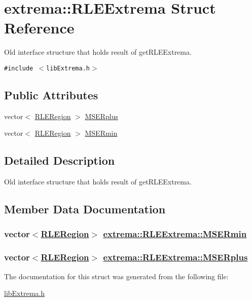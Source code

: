 \hypertarget{structextrema_1_1RLEExtrema}{
\section{extrema::RLEExtrema Struct Reference}
\label{structextrema_1_1RLEExtrema}
}
Old interface structure that holds result of get\-RLEExtrema.  


{\tt \#include $<$lib\-Extrema.h$>$}

\subsection*{Public Attributes}
\begin{CompactItemize}
\item 
vector$<$ \hyperlink{structextrema_1_1RLERegion}{RLERegion} $>$ \hyperlink{structextrema_1_1RLEExtrema_746a2de45213c8dca8240a50223fcfd3}{MSERplus}
\item 
vector$<$ \hyperlink{structextrema_1_1RLERegion}{RLERegion} $>$ \hyperlink{structextrema_1_1RLEExtrema_57b2bfbfce432ab110cb6f0b6826a5aa}{MSERmin}
\end{CompactItemize}


\subsection{Detailed Description}
Old interface structure that holds result of get\-RLEExtrema. 



\subsection{Member Data Documentation}
\hypertarget{structextrema_1_1RLEExtrema_57b2bfbfce432ab110cb6f0b6826a5aa}{
\subsubsection[MSERmin]{\setlength{\rightskip}{0pt plus 5cm}vector$<$\hyperlink{structextrema_1_1RLERegion}{RLERegion}$>$ \hyperlink{structextrema_1_1RLEExtrema_57b2bfbfce432ab110cb6f0b6826a5aa}{extrema::RLEExtrema::MSERmin}}}
\label{structextrema_1_1RLEExtrema_57b2bfbfce432ab110cb6f0b6826a5aa}


\hypertarget{structextrema_1_1RLEExtrema_746a2de45213c8dca8240a50223fcfd3}{
\subsubsection[MSERplus]{\setlength{\rightskip}{0pt plus 5cm}vector$<$\hyperlink{structextrema_1_1RLERegion}{RLERegion}$>$ \hyperlink{structextrema_1_1RLEExtrema_746a2de45213c8dca8240a50223fcfd3}{extrema::RLEExtrema::MSERplus}}}
\label{structextrema_1_1RLEExtrema_746a2de45213c8dca8240a50223fcfd3}




The documentation for this struct was generated from the following file:\begin{CompactItemize}
\item 
\hyperlink{libExtrema_8h}{lib\-Extrema.h}\end{CompactItemize}
